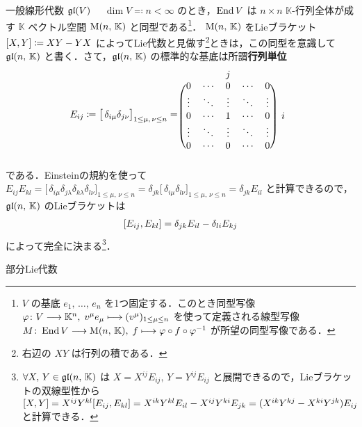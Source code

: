 \documentclass[rep_main]{subfiles}
\begin{document}
\begin{myexample}[label=def:gl-alg]{一般線形代数 $\mathfrak{gl} (V)$}
    　$\dim V \eqqcolon n < \infty$ のとき，$\operatorname{End} V$ は $n \times n$ $\mathbb{K}$-行列全体が成す $\mathbb{K}$ ベクトル空間 $\mathrm{M}(n,\, \mathbb{K})$ と同型である\footnote{$V$ の基底 $e_1,\, \dots,\, e_n$ を1つ固定する．このとき同型写像 $\varphi \colon V \longrightarrow \mathbb{K}^n,\; v^\mu e_\mu \longmapsto (v^\mu)_{1 \le \mu \le n}$ を使って定義される線型写像 $M \colon \operatorname{End} V \longrightarrow \mathrm{M}(n,\, \mathbb{K}),\; f \longmapsto \varphi \circ f \circ \varphi^{-1}$ が所望の同型写像である．}．
    $\mathrm{M}(n,\, \mathbb{K})$ をLieブラケット $\comm{X}{Y} \coloneqq XY - YX$ によってLie代数と見做す\footnote{右辺の $XY$ は行列の積である．}ときは，この同型を意識して $\mathfrak{gl}(n,\, \mathbb{K})$ と書く．さて，$\mathfrak{gl}(n,\, \mathbb{K})$ の標準的な基底は所謂\textbf{行列単位}
    \begin{align}
        E_{ij} \coloneqq \bigl[\, \delta_{i\mu} \delta_{j\nu} \bigr]_{1 \le \mu,\, \nu \le n} 
        = 
        \begin{blockarray}{cccccc}
            & & j & & \\
            \begin{block}{(ccccc)c}
                0 & \cdots & 0 & \cdots & 0 & \\
                \vdots & \ddots & \vdots & \ddots & \vdots & \\
                0 & \cdots & 1 & \cdots & 0 & i \\
                \vdots & \ddots & \vdots & \ddots & \vdots & \\
                0 & \cdots & 0 & \cdots & 0 & \\
            \end{block}
        \end{blockarray}
    \end{align}
    である．Einsteinの規約を使って $E_{ij} E_{kl} = \bigl[\, \delta_{i\mu} \delta_{j\lambda} \delta_{k \lambda} \delta_{l \nu} \bigr]_{1 \le \mu,\, \nu \le n} = \delta_{jk} \bigl[\, \delta_{i\mu} \delta_{l\nu} \bigr]_{1 \le \mu,\, \nu \le n} = \delta_{jk} E_{il}$ と計算できるので，$\mathfrak{gl}(n,\, \mathbb{K})$ のLieブラケットは
    \begin{align}
        \comm{E_{ij}}{E_{kl}} = \delta_{jk} E_{il} - \delta_{li} E_{kj}
    \end{align}
    によって完全に決まる\footnote{$\forall X,\, Y \in \mathfrak{gl}(n,\, \mathbb{K})$ は $X = X^{ij} E_{ij},\, Y = Y^{ij} E_{ij}$ と展開できるので，Lieブラケットの双線型性から $\comm{X}{Y} = X^{ij} Y^{kl}\comm{E_{ij}}{E_{kl}} = X^{ik} Y^{kl} E_{il} - X^{ij}Y^{ki} E_{jk} = (X^{ik} Y^{kj} - X^{ki} Y^{jk}) E_{ij}$ と計算できる．}．
\end{myexample}

\begin{mydef}[]{部分Lie代数}
    
\end{mydef}
\end{document}
